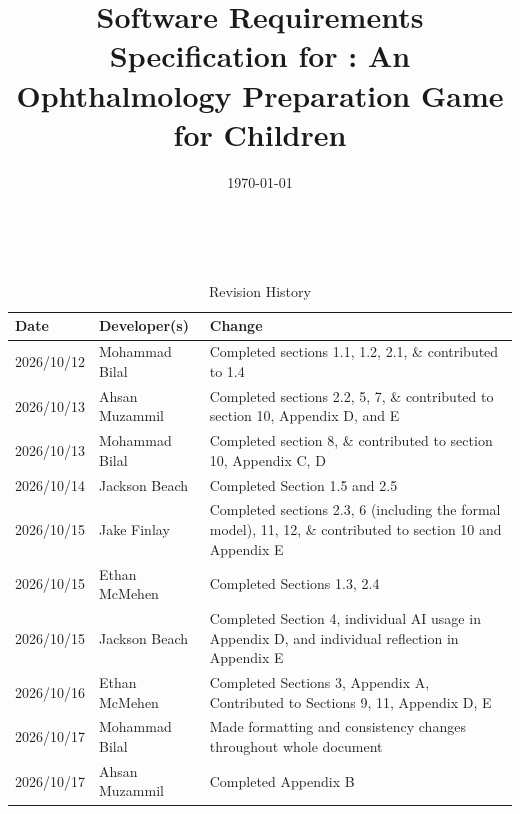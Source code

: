 \documentclass[10pt]{article}
\begin{document}
\title{Software Requirements Specification for \progname: An Ophthalmology Preparation Game for Children} 
\author{\authname}
\date{\today}
	
\maketitle

~\newpage


\tableofcontents

\newpage

\begin{table}[!htbp]
\caption{Revision History} \label{TblRevisionHistory}
\begin{tabularx}{\textwidth}{llX}
\toprule
\textbf{Date} & \textbf{Developer(s)} & \textbf{Change}\\
\midrule
2026/10/12 & Mohammad Bilal & Completed sections 1.1, 1.2, 2.1, \& contributed to 1.4 \\
2026/10/13 & Ahsan Muzammil & Completed sections 2.2, 5, 7, \& contributed to section 10, Appendix D, and E \\
2026/10/13 & Mohammad Bilal & Completed section 8, \& contributed to section 10, Appendix C, D \\
2026/10/14 & Jackson Beach & Completed Section 1.5 and 2.5 \\
2026/10/15 & Jake Finlay & Completed sections 2.3, 6 (including the formal model), 11, 12, \& contributed to section 10 and Appendix E \\
2026/10/15 & Ethan McMehen & Completed Sections 1.3, 2.4 \\
2026/10/15 & Jackson Beach & Completed Section 4, individual AI usage in Appendix D, and individual reflection in Appendix E \\
2026/10/16 & Ethan McMehen & Completed Sections 3, Appendix A, Contributed to Sections 9, 11, Appendix D, E \\
2026/10/17 & Mohammad Bilal & Made formatting and consistency changes throughout whole document \\
2026/10/17 & Ahsan Muzammil & Completed Appendix B \\
\bottomrule
\end{tabularx}
\end{table}

\newpage


\end{document}
